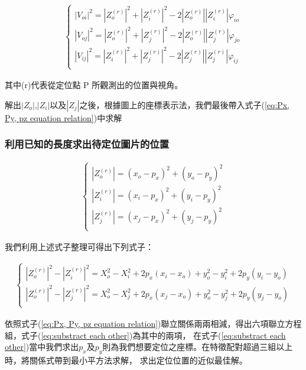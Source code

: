 	\begin{align}
		\left\{
		\begin{array}{cccc}
		|V_{oi}|^2 = |Z_o^{(r)}|^2 + |Z_i^{(r)}|^2 - 2|Z_o^{(r)}||Z_i^{(r)}|\varphi _{io}\\
		|V_{oj}|^2 = |Z_o^{(r)}|^2 + |Z_j^{(r)}|^2 - 2|Z_o^{(r)}||Z_j^{(r)}|\varphi _{jo}\\
		|V_{ij}|^2 = |Z_i^{(r)}|^2 + |Z_j^{(r)}|^2 - 2|Z_j^{(r)}||Z_j^{(r)}|\varphi _{ij}\\
		\end{array}
		\right.
	\end{align}	
	
	其中(r)代表從定位點 P 所觀測出的位置與視角。	
	
	解出$|Z_o|$,$|Z_i|$以及$|Z_j|$之後，根據圖上的座標表示法，我們最後帶入式子(\ref{eq:Px, Py, pz equation relation})中求解
	
	\subsubsection{利用已知的長度求出待定位圖片的位置}
	
	\begin{align}
	\label{eq:Px, Py, pz equation relation}
		\left\{
		\begin{array}{cccc}
		|Z_o^{(r)}| = (x_o - p_x)^2 + (y_o - p_y)^2\\
		|Z_i^{(r)}| = (x_i - p_x)^2 + (y_i - p_y)^2\\
		|Z_j^{(r)}| = (x_j - p_x)^2 + (y_j - p_y)^2\\
		\end{array}
		\right.
	\end{align}	
	
	我們利用上述式子整理可得出下列式子：
	
	\begin{align}
	\label{eq:substract each other}
		\left\{
		\begin{array}{cccc}
		|Z_o^{(r)}|^2 - |Z_i^{(r)}|^2 = X_o^2 - X_i^2 + 2p_x(x_i - x_o) + y_o^2 - y_i^2 + 2p_y(y_i-y_o)\\
		|Z_o^{(r)}|^2 - |Z_j^{(r)}|^2 = X_o^2 - X_j^2 + 2p_x(x_j - x_o) + y_o^2 - y_j^2 + 2p_y(y_j-y_o)\\
		\end{array}
		\right.
	\end{align}	
	
	依照式子(\ref{eq:Px, Py, pz equation relation})聯立關係兩兩相減，得出六項聯立方程組，式子(\ref{eq:substract each other})為其中的兩項，
	在式子(\ref{eq:substract each other})當中我們求出$p_x$及$p_y$則為我們想要定位之座標。在特徵配對超過三組以上時，將關係式帶到最小平方法求解，
	求出定位位置的近似最佳解。
	
